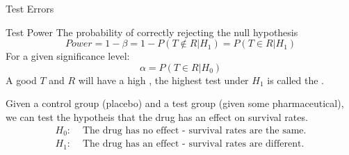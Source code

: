 \begin{definitionbox}{Test Errors}
	\begin{itemize}
    \end{itemize}
\end{definitionbox}
\begin{definitionbox}{Test Power}
	The probability of correctly rejecting the null hypothesis
	\[Power = 1 - \beta = 1 - P(T \not\in R|H_1) = P(T \in R|H_1)\]
	For a given significance level:
	\[\alpha = P(T \in R| H_0)\]
	A good  $T$ and  $R$ will have a high , the highest  test under $H_1$ is called the .
\end{definitionbox}
Given a control group (placebo) and a test group (given some pharmaceutical), we can test the hypotheis that the drug has an effect on survival rates.
\[\begin{split}
        H_0: & \text{ The drug has no effect - survival rates are the same.} \\
        H_1: & \text{ The drug has an effect - survival rates are different.} \\
    \end{split}\]
